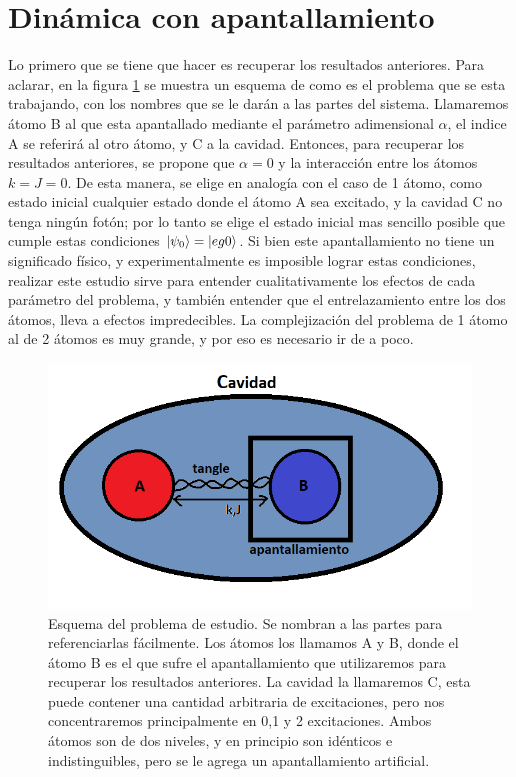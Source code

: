 \section{Dinámica con apantallamiento}
\label{sec4:dinamica apantallamiento}
Lo primero que se tiene que hacer es recuperar los resultados anteriores. Para aclarar, en la figura \ref{fig4:diagrama esquematico} se muestra un esquema de como es el problema que se esta trabajando, con los nombres que se le darán a las partes del sistema. Llamaremos átomo B al que esta apantallado mediante el parámetro adimensional $\alpha$, el indice A se referirá al otro átomo, y C a la cavidad. Entonces, para recuperar los resultados anteriores, se propone que $\alpha=0$ y la interacción entre los átomos $k=J=0$. De esta manera, se elige en analogía con el caso de 1 átomo, como estado inicial cualquier estado donde el átomo A sea excitado, y la cavidad C no tenga ningún fotón; por lo tanto se elige el estado inicial mas sencillo posible que cumple estas condiciones $\ket{\psi_0}=\ket{eg0}$. Si bien este apantallamiento no tiene un significado físico, y experimentalmente es imposible lograr estas condiciones, realizar este estudio sirve para entender cualitativamente los efectos de cada parámetro del problema, y también entender que el entrelazamiento entre los dos átomos, lleva a efectos impredecibles. La complejización del problema de 1 átomo al de 2 átomos es muy grande, y por eso es necesario ir de a poco.
\begin{figure}[H]
    \begin{minipage}[c]{0.67\textwidth}
        \includegraphics[width=\textwidth]{figuras/ch4/diagrama esquematico.png}
    \end{minipage}\hfill
    \begin{minipage}[c]{0.3\textwidth}
    \caption{Esquema del problema de estudio. Se nombran a las partes para referenciarlas fácilmente. Los átomos los llamamos A y B, donde el átomo B es el que sufre el apantallamiento que utilizaremos para recuperar los resultados anteriores. La cavidad la llamaremos C, esta puede contener una cantidad arbitraria de excitaciones, pero nos concentraremos principalmente en 0,1 y 2 excitaciones. Ambos átomos son de dos niveles, y en principio son idénticos e indistinguibles, pero se le agrega un apantallamiento artificial.}
    \label{fig4:diagrama esquematico}
  \end{minipage}
\end{figure}
